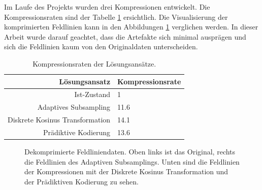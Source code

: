 Im Laufe des Projekts wurden drei Kompressionen entwickelt. Die Kompressionsraten sind der Tabelle \ref{einleitung:tabelle} ersichtlich. Die Visualisierung der komprimierten Feldlinien kann in den Abbildungen \ref{einleitung:artefakte} verglichen werden. In dieser Arbeit wurde darauf geachtet, dass die Artefakte sich minimal ausprägen und sich die Feldlinien kaum von den Originaldaten unterscheiden.
\begin{table}[!htbp]
	\center
	\begin{tabular}{r|l}
		Lösungsansatz & Kompressionsrate \\\hline
		Ist-Zustand & 1\\
		Adaptives Subsampling & 11.6 \\
		Diskrete Kosinus Transformation & 14.1 \\
		Prädiktive Kodierung & 13.6\\
	\end{tabular}
	\caption{Kompressionsraten der Lösungsansätze.}
	\label{einleitung:tabelle}
\end{table}
\begin{figure}[!htbp]
\center
{}
\caption{Dekomprimierte Feldliniendaten. Oben links ist das Original, rechts die Feldlinien des Adaptiven Subsamplings. Unten sind die Feldlinien der Kompressionen mit der Diskrete Kosinus Transformation und der Prädiktiven Kodierung zu sehen.}
\label{einleitung:artefakte}
\end{figure}